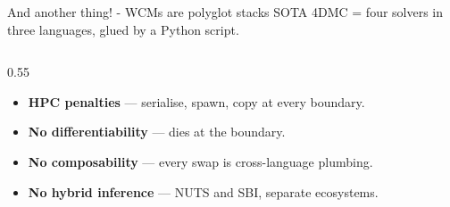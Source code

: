 \documentclass[aspectratio=169]{beamer}
\begin{document}
\begin{frame}{And another thing! - WCMs are polyglot stacks}
	\small
SOTA 4DMC = four solvers in three languages, glued by a Python script.
	\par\normalsize

	\vspace{1mm}
	\begin{columns}[c,onlytextwidth]
		\begin{column}{0.55\textwidth}
			\small
			\begin{itemize}\itemsep6pt
				\item \textbf{HPC penalties} --- serialise, spawn, copy at every
				boundary.

				\item \textbf{No differentiability} --- dies at the
				boundary.

				\item \textbf{No composability} --- every swap is cross-language
				plumbing.

				\item \textbf{No hybrid inference} --- NUTS and SBI, separate
				ecosystems.


\end{itemize}
\end{column}
\end{columns}
\end{frame}
\end{document}
